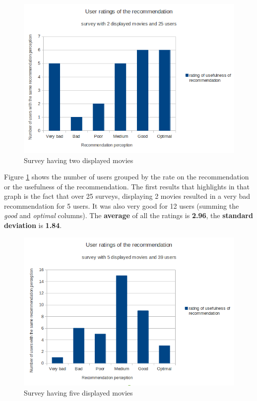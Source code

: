 \begin{figure}
  \centering
  \includegraphics[width=\textwidth]{figures/survey2_graph1.png}
  \caption{Survey having two displayed movies}
  \label{fig:survey2}
\end{figure}

Figure \ref{fig:survey2} shows the number of users grouped by the rate on the recommendation or the usefulness of the recommendation. The first results that highlights in that graph is the fact that over 25 surveys, displaying 2 movies resulted in a very bad recommendation for 5 users. It was also very good for 12 users (summing the \textit{good} and \textit{optimal} columns). The \textbf{average} of all the ratings is \textbf{2.96}, the \textbf{standard deviation} is \textbf{1.84}.   

\begin{figure}
  \centering
  \includegraphics[width=\textwidth]{figures/survey5_graph1.png}
  \caption{Survey having five displayed movies}
  \label{fig:survey5}
\end{figure}

